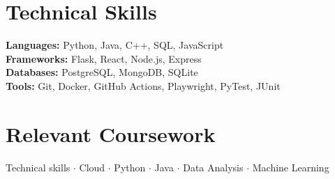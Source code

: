 \documentclass[letterpaper,10pt]{article}
\begin{document}
\section{Technical Skills}
\textbf{Languages:} Python, Java, C++, SQL, JavaScript \\
\textbf{Frameworks:} Flask, React, Node.js, Express \\
\textbf{Databases:} PostgreSQL, MongoDB, SQLite \\
\textbf{Tools:} Git, Docker, GitHub Actions, Playwright, PyTest, JUnit

\section{Relevant Coursework}
Technical skills \(\cdot\) Cloud \(\cdot\) Python \(\cdot\) Java \(\cdot\) Data Analysis \(\cdot\) Machine Learning
\end{document}
